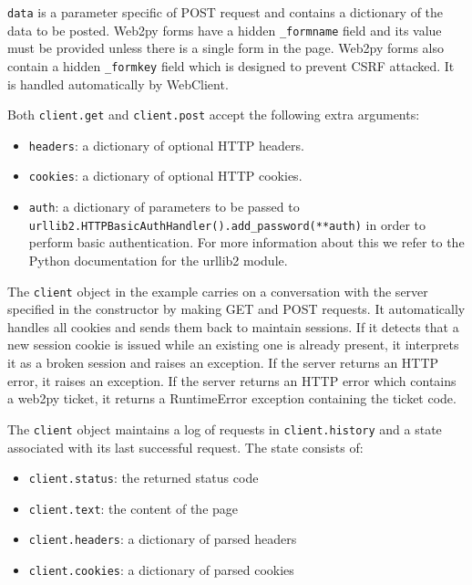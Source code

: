 \documentclass[justified,sixbynine,notoc]{tufte-book}
\def\ft{\small\tt}
\begin{document}
\begin{fullwidth}
{\ft data} is a parameter specific of POST request and contains a dictionary of the data to be posted. Web2py forms have a hidden {\ft \_formname} field and its value must be provided unless there is a single form in the page. Web2py forms also contain a hidden {\ft \_formkey} field which is designed to prevent CSRF attacked. It is handled automatically by WebClient.

Both {\ft client.get} and {\ft client.post} accept the following extra arguments:
\begin{itemize}
\item {\ft headers}: a dictionary of optional HTTP headers.

\item {\ft cookies}: a dictionary of optional HTTP cookies.

\item {\ft auth}: a dictionary of parameters to be passed to {\ft urllib2.HTTPBasicAuthHandler().add\_password(**auth)} in order to perform basic authentication. For more information about this we refer to the Python documentation for the urllib2 module.
\end{itemize}

The {\ft client} object in the example carries on a conversation with the server specified in the constructor by making GET and POST requests. It automatically handles all cookies and sends them back to maintain sessions. If it detects that a new session cookie is issued while an existing one is already present, it interprets it as a broken session and raises an exception. If the server returns an HTTP error, it raises an exception. If the server returns an HTTP error which contains a web2py ticket, it returns a RuntimeError exception containing the ticket code.

The {\ft client} object maintains a log of requests in {\ft client.history} and a state associated with its last successful request. The state consists of:

\begin{itemize}
\item {\ft client.status}: the returned status code

\item {\ft client.text}: the content of the page

\item {\ft client.headers}: a dictionary of parsed headers

\item {\ft client.cookies}: a dictionary of parsed cookies


\end{itemize}
\end{fullwidth}
\end{document}
